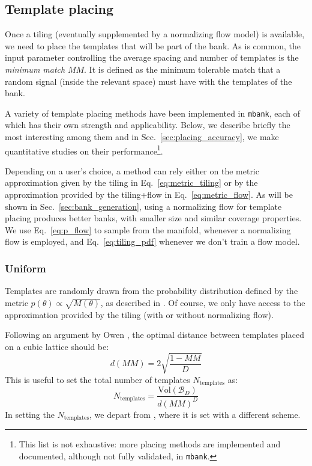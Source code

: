\documentclass[twocolumn,showpacs,preprintnumbers,nofootinbib,prd,
superscriptaddress,10pt]{revtex4-2}
\begin{document}
\subsection{Template placing} \label{sec:template_placing}

Once a tiling (eventually supplemented by a normalizing flow model) is available, we need to place the templates that will be part of the bank.
As is common, the input parameter controlling the average spacing and number of templates is the {\it minimum match} $MM$. It is defined as the minimum tolerable match that a random signal (inside the relevant space) must have with the templates of the bank.

A variety of template placing methods have been implemented in \texttt{mbank}, each of which has their own strength and applicability.
Below, we describe briefly the most interesting among them and in Sec.~\ref{sec:placing_accuracy}, we make quantitative studies on their performance\footnote{
This list is not exhaustive: more placing methods are implemented and documented, although not fully validated, in \texttt{mbank}.}.

Depending on a user's choice, a method can rely either on the metric approximation given by the tiling in Eq.~\eqref{eq:metric_tiling} or by the approximation provided by the tiling+flow in Eq.~\eqref{eq:metric_flow}.
As will be shown in Sec.~\ref{sec:bank_generation}, using a normalizing flow for template placing produces better banks, with smaller size and similar coverage properties.
We use Eq.~\eqref{eq:p_flow} to sample from the manifold, whenever a normalizing flow is employed, and Eq.~\eqref{eq:tiling_pdf} whenever we don't train a flow model.

\subsubsection{Uniform}\label{par:uniform}
Templates are randomly drawn from the probability distribution defined by the metric $p(\theta) \propto \sqrt{M(\theta)}$, as described in \cite{Messenger:2008ta}.
Of course, we only have access to the approximation provided by the tiling (with or without normalizing flow).

Following an argument by Owen \cite{owen_metric}, the optimal distance between templates placed on a cubic lattice should be:
\begin{equation}
	d(MM) = 2 \sqrt{\frac{1-MM}{D}}
\end{equation}
This is useful to set the total number of templates $N_\mathrm{templates}$ as:
\begin{equation} \label{eq:N_templates}
	N_{\text{templates}} = \frac{\text{Vol}(\mathcal{B}_D)}{d(MM)^D}
\end{equation}
In setting the $N_{\text{templates}}$, we depart from \cite{Messenger:2008ta}, where it is set with a different scheme.
\end{document}
